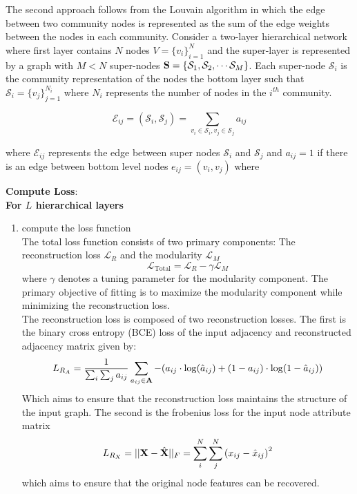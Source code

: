 \documentclass[a4paper,12pt]{article}
\begin{document}
\begin{itemize}
\begin{enumerate}
{\begin{enumerate}
					The second approach follows from the Louvain algorithm \cite{} in which the edge between two community nodes is represented as the sum of the edge weights between the nodes in each community. Consider a two-layer hierarchical network where first layer contains $N$ nodes $V = \{v_i\}_{i=1}^N$ and the super-layer is represented by a graph with $M<N$ super-nodes $\mathcal{\bf S} = \{\mathcal{S}_1, \mathcal{S}_2, \cdots \mathcal{S}_M\}$. Each super-node $\mathcal{S}_i$ is the community representation of the nodes the bottom layer such that $\mathcal{S}_i = \{v_j\}_{j=1}^{N_i}$ where $N_i$ represents the number of nodes in the $i^{th}$ community.    
					
					
					\[\mathcal{E}_{ij} = (\mathcal{S}_i, \mathcal{S}_j) = \sum_{v_i \in \mathcal{S}_i, v_j \in \mathcal{S}_j}  a_{ij} \]
					
					where $\mathcal{E}_{ij}$ represents the edge between super nodes $\mathcal{S}_i$ and $\mathcal{S}_j$ and $a_{ij} = 1$ if there is an edge between bottom level nodes $e_{ij}= (v_i,v_j)$ where 
					
			\end{enumerate}
			
			
			\item[2.2.2]{\textbf{Compute Loss}: \\
				\textbf{For $L$ hierarchical layers}
			\begin{enumerate}
				\item[]{compute the loss function \\
					
					The total loss function consists of two primary components: The reconstruction loss $\mathcal{L}_R$ and the modularity $\mathcal{L}_M$
					\[\mathcal{L}_{\text{Total}} = \mathcal{L}_R - \gamma\mathcal{L}_M \]
					where $\gamma$ denotes a tuning parameter for the modularity component. The primary objective of fitting is to maximize the modularity component while minimizing the reconstruction loss. \\
					
					The reconstruction loss is composed of two reconstruction losses. The first is the binary cross entropy (BCE) loss of the input adjacency and reconstructed adjacency matrix given by: 
					\[L_{R_A} = \frac{1}{\sum_i\sum_j a_{ij}} \sum_{a_{ij}\in {\bf A}} -(a_{ij} \cdot\log(\hat{a}_{ij})+(1 - a_{ij})\cdot\log(1 - \hat{a}_{ij})) \]
					Which aims to ensure that the reconstruction loss maintains the structure of the input graph. The second is the frobenius loss for the input node attribute matrix 
					\[L_{R_X} = ||{\bf X} - \hat{\bf X}||_F = \sum_i^N \sum_j^N \left(x_{ij} - \hat{x}_{ij}\right)^2 \]
					which aims to ensure that the original node features can be recovered. 
					
}
\end{enumerate}}}
\end{enumerate}
\end{itemize}
\end{document}
